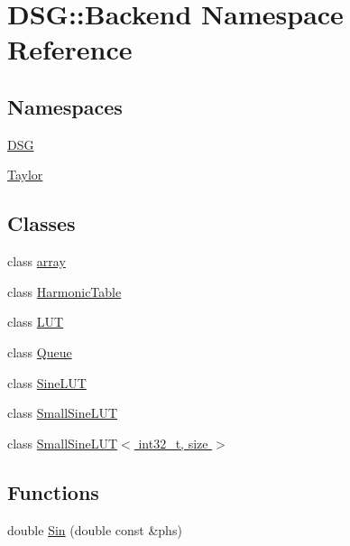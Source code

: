 \hypertarget{namespaceDSG_1_1Backend}{\section{D\+S\+G\+:\+:Backend Namespace Reference}
\label{namespaceDSG_1_1Backend}
}
\subsection*{Namespaces}
\begin{DoxyCompactItemize}
\item 
 \hyperlink{namespaceDSG_1_1Backend_1_1DSG}{D\+S\+G}
\item 
 \hyperlink{namespaceDSG_1_1Backend_1_1Taylor}{Taylor}
\end{DoxyCompactItemize}
\subsection*{Classes}
\begin{DoxyCompactItemize}
\item 
class \hyperlink{classDSG_1_1Backend_1_1array}{array}
\item 
class \hyperlink{classDSG_1_1Backend_1_1HarmonicTable}{Harmonic\+Table}
\item 
class \hyperlink{classDSG_1_1Backend_1_1LUT}{L\+U\+T}
\item 
class \hyperlink{classDSG_1_1Backend_1_1Queue}{Queue}
\item 
class \hyperlink{classDSG_1_1Backend_1_1SineLUT}{Sine\+L\+U\+T}
\item 
class \hyperlink{classDSG_1_1Backend_1_1SmallSineLUT}{Small\+Sine\+L\+U\+T}
\item 
class \hyperlink{classDSG_1_1Backend_1_1SmallSineLUT_3_01int32__t_00_01size_01_4}{Small\+Sine\+L\+U\+T$<$ int32\+\_\+t, size $>$}
\end{DoxyCompactItemize}
\subsection*{Functions}
\begin{DoxyCompactItemize}
\item 
double \hyperlink{namespaceDSG_1_1Backend_abc92c970184d9c3e4fa6741f80c58836}{Sin} (double const \&phs)
\end{DoxyCompactItemize}



